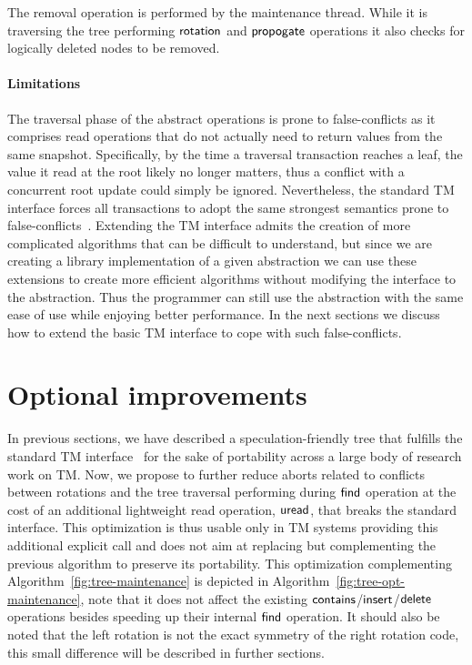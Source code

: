 The removal operation is performed by the maintenance thread. While it is traversing the tree performing $\act{rotation}$ and $\act{propogate}$ operations it
also checks for logically deleted nodes to be removed.

\paragraph{Limitations}
The traversal phase of the abstract operations is prone to false-conflicts as it comprises read operations that 
do not actually need to return values from the same snapshot. Specifically, by the time a traversal transaction 
reaches a leaf, the value it read at the root likely no longer matters, thus a conflict 
with a concurrent root update could simply be ignored. Nevertheless, the standard TM interface
forces all transactions to adopt the same strongest semantics prone to false-conflicts~\cite{GG11}.
Extending the TM interface admits the creation of more complicated algorithms that can be difficult to understand, but
since we are creating a library implementation of a given abstraction
we can use these extensions to create more efficient algorithms without modifying the interface to the abstraction.
Thus the programmer can still use the abstraction with the same ease of use while enjoying better performance.
In the next sections we discuss how to extend the basic TM interface to cope with such false-conflicts.

\section{Optional improvements}\label{sec:improvements}

In previous sections, we have described a speculation-friendly tree that fulfills the standard TM interface~\cite{abi} 
for the sake of portability across a large body of research work on TM.
Now, we propose to further reduce aborts related to conflicts between rotations and the tree traversal performing during $\act{find}$ operation at the cost of an additional 
lightweight read operation, 
$\act{uread}$, that breaks the standard interface. This optimization is thus usable only in TM systems providing this additional 
explicit call
and does not aim at replacing but complementing the previous algorithm 
to preserve its portability. This optimization complementing Algorithm~\ref{fig:tree-maintenance} is depicted in Algorithm~\ref{fig:tree-opt-maintenance}, note that it does not
affect the existing $\act{contains}$/$\act{insert}$/$\act{delete}$ operations besides speeding up their internal $\act{find}$ 
operation.
It should also be noted that the left rotation is not the exact symmetry of the right rotation code,
this small difference will be described in further sections. 


